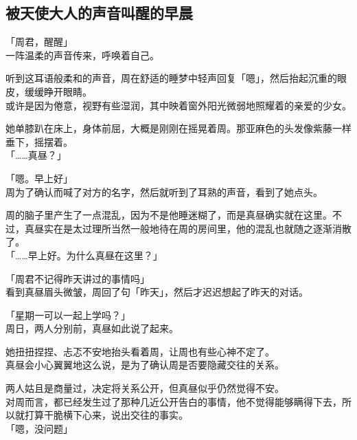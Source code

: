 \subsection{被天使大人的声音叫醒的早晨}

「周君，醒醒」\\

一阵温柔的声音传来，呼唤着自己。

听到这耳语般柔和的声音，周在舒适的睡梦中轻声回复「嗯」，然后抬起沉重的眼皮，缓缓睁开眼睛。\\

或许是因为倦意，视野有些湿润，其中映着窗外阳光微弱地照耀着的亲爱的少女。

她单膝趴在床上，身体前屈，大概是刚刚在摇晃着周。那亚麻色的头发像紫藤一样垂下，摇摆着。\\

「……真昼？」

「嗯。早上好」\\

周为了确认而喊了对方的名字，然后就听到了耳熟的声音，看到了她点头。

周的脑子里产生了一点混乱，因为不是他睡迷糊了，而是真昼确实就在这里。不过，真昼实在是太过理所当然一般地待在周的房间里，他的混乱也就随之逐渐消散了。\\

「……早上好。为什么真昼在这里？」

「周君不记得昨天讲过的事情吗」\\

看到真昼眉头微皱，周回了句「昨天」，然后才迟迟想起了昨天的对话。\\

\vspace{2\baselineskip}

「星期一可以一起上学吗？」\\

周日，两人分别前，真昼如此说了起来。

她扭扭捏捏、忐忑不安地抬头看着周，让周也有些心神不定了。\\

真昼会小心翼翼地这么说，是为了确认周是否要隐藏交往的关系。

两人姑且是商量过，决定将关系公开，但真昼似乎仍然觉得不安。\\

对周而言，都已经发生过了那种几近公开告白的事情，他不觉得能够瞒得下去，所以就打算干脆横下心来，说出交往的事实。\\

「嗯，没问题」

